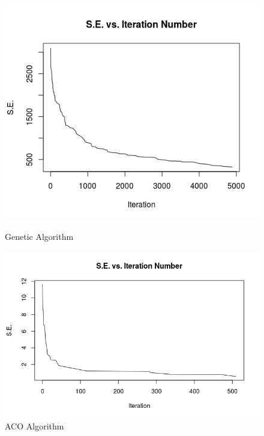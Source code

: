 \documentclass[11pt,a4paper,final]{article}
\begin{document}
	\begin{figure}[H]
		\begin{minipage}{.5\textwidth}
			\centering
			\includegraphics[scale= 0.4]{ch130GAPlot}
			\caption{Genetic Algorithm}
			\label{fig:ch130GA}
		\end{minipage}
		\begin{minipage}{.5\textwidth}
			\centering
			\includegraphics[scale=0.4]{ch130ACOPlot}
			\caption{ACO Algorithm}					
			\label{fig:ch130ACO}
		\end{minipage}
	\end{figure}	
	
	
\end{document}
